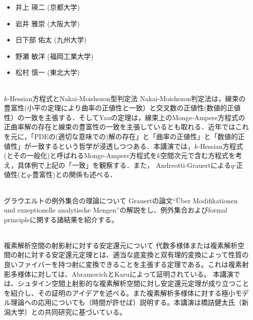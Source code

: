 \documentclass[dvipdfmx,a4paper,12pt]{article}
\theoremstyle{plain} %
\theoremstyle{definition} %
\begin{document}
  \vskip5mm
  
\begin{itemize}
  \setlength{\parskip}{0cm} 
  \setlength{\itemsep}{0cm}
\item 井上 瑛二 (京都大学)
\item 岩井 雅崇 (大阪大学)
\item 日下部 佑太 (九州大学)
\item 野瀬 敏洋 (福岡工業大学)
\item 松村 慎一 (東北大学)
  \end{itemize}


\newpage

\vskip5mm

\vskip5mm
\\
$k$-Hessian方程式とNakai-Moishezon型判定法
\vskip3mm
Nakai-Moishezon判定法は，線束の豊富性(小平の定理により曲率の正値性と一致）と交叉数の正値性(数値的正値性）の一致を主張する．そしてYauの定理は，線束上のMonge-Ampere方程式の正曲率解の存在と線束の豊富性の一致を主張しているとも取れる．近年ではこれを元に，「PDEの(適切な意味での)解の存在」と「曲率の正値性」と「数値的正値性」が一致するという哲学が浸透しつつある．本講演では，$k$-Hessian方程式(とその一般化)と呼ばれるMonge-Ampere方程式を$k$空間次元で含む方程式を考え，具体例で上記の「一致」を観察する．また， Andreotti-Grauertによる$q$-正値性(と$q$-豊富性)との関係も述べる．
\vskip8mm

\\
グラウエルトの例外集合の理論について 
\vskip3mm
Grauertの論文``\"Uber Modifikationen und exzeptionelle analytische Mengen''の解説をし、例外集合およびformal principleに関する諸結果を紹介する。 
\vskip8mm

\\
複素解析空間の射影射に対する安定還元について
\vskip3mm
代数多様体または複素解析空間の射に対する安定還元定理とは、適当な底変換と双有理的変換によって性質の良いファイバーを持つ射に変換できることを主張する定理である。これは複素射影多様体に対しては、AbramovichとKaruによって証明されている。
本講演では、シュタイン空間上射影的な複素解析空間に対し安定還元定理が成り立つことを紹介し、その証明のアイデアを述べる。また複素解析多様体に対する極小モデル理論への応用についても（時間が許せば）説明する。本講演は橋詰健太氏（新潟大学）との共同研究に基づいている。
\vskip5mm

\newpage
\end{document}
